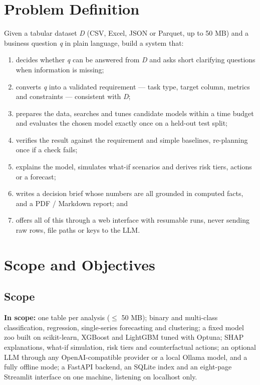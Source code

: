\section{Problem Definition}\label{sec:1.2}

Given a tabular dataset \textit{D} (CSV, Excel, JSON or Parquet, up to 50 MB) and a business question \textit{q} in plain language, build a system that:

\begin{enumerate}
  \item decides whether \textit{q} can be answered from \textit{D} and asks short clarifying questions when information is missing;
  \item converts \textit{q} into a validated requirement --- task type, target column, metrics and constraints --- consistent with \textit{D};
  \item prepares the data, searches and tunes candidate models within a time budget and evaluates the chosen model exactly once on a held-out test split;
  \item verifies the result against the requirement and simple baselines, re-planning once if a check fails;
  \item explains the model, simulates what-if scenarios and derives risk tiers, actions or a forecast;
  \item writes a decision brief whose numbers are all grounded in computed facts, and a PDF / Markdown report; and
  \item offers all of this through a web interface with resumable runs, never sending raw rows, file paths or keys to the LLM.
\end{enumerate}

\FloatBarrier
\section{Scope and Objectives}\label{sec:1.3}

\subsection{Scope}\label{sec:1.3.1}

\textbf{In scope:} one table per analysis (\ensuremath{\leq} 50 MB); binary and multi-class classification, regression, single-series forecasting and clustering; a fixed model zoo built on scikit-learn, XGBoost and LightGBM tuned with Optuna; SHAP explanations, what-if simulation, risk tiers and counterfactual actions; an optional LLM through any OpenAI-compatible provider or a local Ollama model, and a fully offline mode; a FastAPI backend, an SQLite index and an eight-page Streamlit interface on one machine, listening on localhost only.

